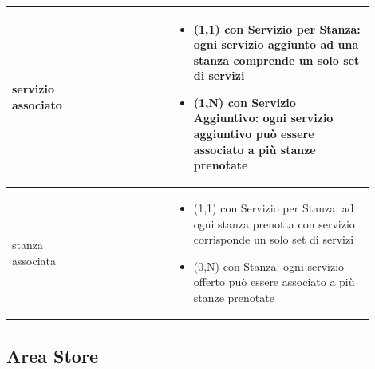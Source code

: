 \documentclass[12pt,a4paper]{article}
\begin{document}
\begin{center}
\begin{longtable}{|p{0.16\linewidth}|p{0.24\linewidth}|p{0.50\linewidth}|}
\hline
servizio associato 				& \begin{flushleft}\vspace{-25pt} \end{flushleft}
					& \begin{itemize}
						\setlength{\itemindent}{-1em}
						\vspace{-25pt}
						\setlength\itemsep{-0.25em}
						\item (1,1) con Servizio per Stanza: ogni servizio aggiunto ad una stanza comprende un solo set di servizi
						\item (1,N) con Servizio Aggiuntivo: ogni servizio aggiuntivo può essere associato a più stanze prenotate
					\end{itemize}\\ 

\hline
stanza associata 				& \begin{flushleft}\vspace{-25pt}  \end{flushleft}
					& \begin{itemize}
						\setlength{\itemindent}{-1em}
						\vspace{-25pt}
						\setlength\itemsep{-0.25em}
						\item (1,1) con Servizio per Stanza: ad ogni stanza prenotta con servizio corrisponde un solo set di servizi
						\item (0,N) con Stanza: ogni servizio offerto può essere associato a più stanze prenotate
					\end{itemize}\\ 

\hline

\end{longtable}
\end{center}
\pagebreak
\subsection{Area Store}
\end{document}
